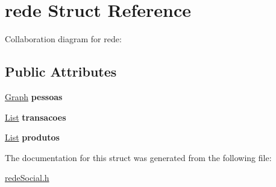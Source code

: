 \hypertarget{structrede}{}\section{rede Struct Reference}
\label{structrede}


Collaboration diagram for rede\+:
\subsection*{Public Attributes}
\begin{DoxyCompactItemize}
\item 
\mbox{\label{structrede_abc1e9ecb33c4dce11ba7171338bdc33a}} 
\hyperlink{grafo_8h_ae8a75164dd0ab110cf74a450957fcbbd}{Graph} {\bfseries pessoas}
\item 
\mbox{\label{structrede_a547b606179bc015c50f9247c850fad1f}} 
\hyperlink{lista_8h_a698ff83165b8296011a50bb9aba83964}{List} {\bfseries transacoes}
\item 
\mbox{\label{structrede_a7bab2bfc785aa45fab61d50802ab8fa3}} 
\hyperlink{lista_8h_a698ff83165b8296011a50bb9aba83964}{List} {\bfseries produtos}
\end{DoxyCompactItemize}


The documentation for this struct was generated from the following file\+:\begin{DoxyCompactItemize}
\item 
\hyperlink{rede_social_8h}{rede\+Social.\+h}\end{DoxyCompactItemize}
